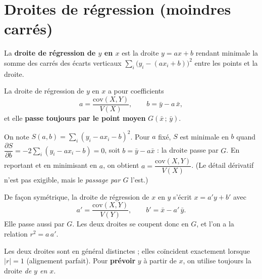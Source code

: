 \section{Droites de régression (moindres carrés)}

\begin{definition}
La \textbf{droite de régression de $y$ en $x$} est la droite $y=ax+b$ rendant minimale la
somme des carrés des écarts verticaux $\sum_{i}\big(y_i-(ax_i+b)\big)^2$ entre les points et
la droite.
\end{definition}

\begin{theoreme}[Droite de $y$ en $x$]
La droite de régression de $y$ en $x$ a pour coefficients
\[
a=\frac{\mathrm{cov}(X,Y)}{V(X)},\qquad b=\bar y-a\,\bar x,
\]
et elle \textbf{passe toujours par le point moyen} $G(\bar x\,;\,\bar y)$.
\end{theoreme}

\begin{remarque}
On note $S(a,b)=\sum_i(y_i-ax_i-b)^2$. Pour $a$ fixé, $S$ est minimale en $b$ quand
$\dfrac{\partial S}{\partial b}=-2\sum_i(y_i-ax_i-b)=0$, soit $b=\bar y-a\bar x$ : la droite
passe par $G$. En reportant et en minimisant en $a$, on obtient
$a=\dfrac{\mathrm{cov}(X,Y)}{V(X)}$. (Le détail dérivatif n'est pas exigible, mais le
\emph{passage par $G$} l'est.)
\end{remarque}

\begin{propriete}[Droite de $x$ en $y$]
De façon symétrique, la droite de régression de $x$ en $y$ s'écrit $x=a'y+b'$ avec
\[
a'=\frac{\mathrm{cov}(X,Y)}{V(Y)},\qquad b'=\bar x-a'\,\bar y .
\]
Elle passe aussi par $G$. Les deux droites se coupent donc en $G$, et l'on a la relation
$r^{2}=a\,a'$.
\end{propriete}

\begin{remarque}
Les deux droites sont en général distinctes ; elles coïncident exactement lorsque $|r|=1$
(alignement parfait). Pour \textbf{prévoir} $y$ à partir de $x$, on utilise toujours la droite
\emph{de $y$ en $x$}.
\end{remarque}


